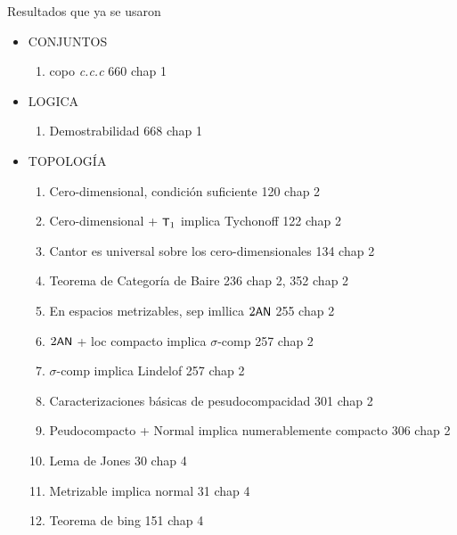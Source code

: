     \begin{flushright}
        Resultados que ya se usaron
    \end{flushright}
    \begin{itemize}
        \item CONJUNTOS
        \begin{enumerate}
            \item copo \textit{c.c.c} \hfill 660 chap 1
        \end{enumerate}
        \item LOGICA
        \begin{enumerate}
            \item Demostrabilidad \hfill 668 chap 1
        \end{enumerate}
        \item TOPOLOGÍA
        \begin{enumerate}
            \item Cero-dimensional, condición suficiente \hfill 120 chap 2
            \item Cero-dimensional + $\text{\textsf{\small T}}_1$ implica Tychonoff \hfill 122 chap 2
            \item Cantor es universal sobre los cero-dimensionales \hfill 134 chap 2
            \item Teorema de Categoría de Baire \hfill 236 chap 2, 352 chap 2
            \item En espacios metrizables, sep imllica $2\text{\textsf{\small AN}}$ \hfill 255 chap 2
            \item $2\text{\textsf{\small AN}}$ + loc compacto implica $\sigma$-comp \hfill 257 chap 2
            \item $\sigma$-comp implica Lindelof \hfill 257 chap 2
            \item Caracterizaciones básicas de pesudocompacidad	301 chap 2
            \item Peudocompacto + Normal implica numerablemente compacto \hfill 306 chap 2
            \item Lema de Jones \hfill 30 chap 4
            \item Metrizable implica normal \hfill 31 chap 4
            \item Teorema de bing \hfil 151 chap 4
        \end{enumerate}
    \end{itemize}